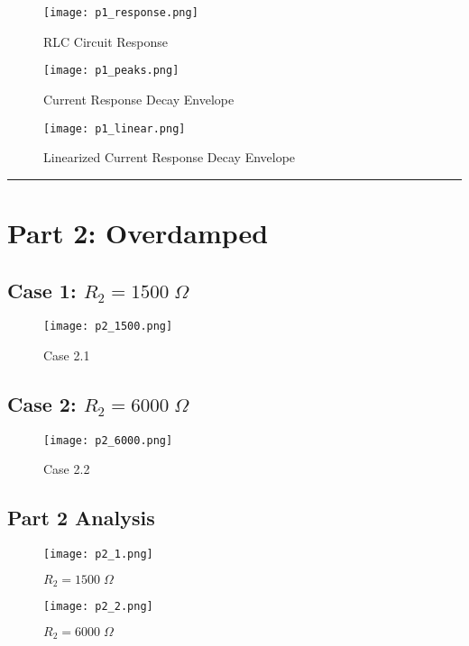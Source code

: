\documentclass[11pt]{article}
\begin{document}
\begin{figure}[H]
    \centering
    \texttt{[image: p1\_response.png]}
    \caption{RLC Circuit Response}
    \label{fig:my_label}
\end{figure}
\begin{figure}[H]
    \centering
    \texttt{[image: p1\_peaks.png]}
    \caption{Current Response Decay Envelope}
    \label{fig:my_label}
\end{figure}
\begin{figure}[H]
    \centering
    \texttt{[image: p1\_linear.png]}
    \caption{Linearized Current Response Decay Envelope}
    \label{fig:my_label}
\end{figure}
\vspace{5mm}
\hrule
\vspace{3mm}


\section*{\textcolor{mycolor}{Part 2: Overdamped}}
\subsection*{\textcolor{mycolor}{Case 1: $R_2=1500\;\Omega$}}
\begin{figure}[H]
  \centering
  \texttt{[image: p2\_1500.png]}
  \caption{Case 2.1}
  \label{fig:3}
\end{figure}
\subsection*{\textcolor{mycolor}{Case 2: $R_2=6000\;\Omega$}}
\begin{figure}[H]
  \centering
  \texttt{[image: p2\_6000.png]}
  \caption{Case 2.2}
  \label{fig:4}
\end{figure}

\subsection*{\textcolor{mycolor}{Part 2 Analysis}}
\begin{figure}[H]
    \centering
    \texttt{[image: p2\_1.png]}
    \caption{$R_2 = 1500 \;\Omega$}
    \label{fig:chart1}
\end{figure}

\begin{figure}[H]
    \centering
    \texttt{[image: p2\_2.png]}
    \caption{$R_2 = 6000 \;\Omega$}
    \label{fig:chart2}
\end{figure}
\end{document}

